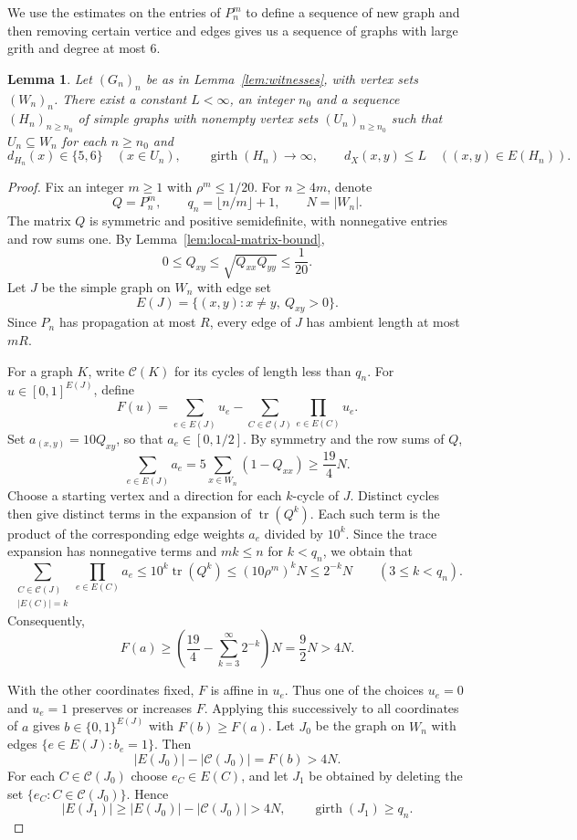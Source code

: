 \documentclass[11pt,a4paper]{article}
\newtheorem{lemma}[theorem]{Lemma}
\theoremstyle{definition}\newtheorem{definition}[theorem]{Definition}
\theoremstyle{remark}\newtheorem{remark}[theorem]{Remark}
\DeclareMathOperator{\girth}{girth}
\begin{document}
We use the estimates on the entries of $P_n^m$ to define a sequence of new graph and then removing certain vertice and edges gives us a sequence of graphs with large grith and degree at most $6$.
\begin{lemma}\label{lem:extraction}
Let $(G_n)_n$ be as in Lemma~\ref{lem:witnesses}, with vertex sets
$(W_n)_n$. There exist a constant $L<\infty$, an integer $n_0$ and a sequence
$(H_n)_{n\ge n_0}$ of simple graphs with nonempty vertex sets
$(U_n)_{n\ge n_0}$ such that $U_n\subseteq W_n$ for each $n\ge n_0$ and
$$
d_{H_n}(x)\in\{5,6\}\quad(x\in U_n),\qquad
\girth(H_n)\longrightarrow\infty,\qquad
d_X(x,y)\le L\quad((x,y)\in E(H_n)).
$$
\end{lemma}
\begin{proof}
Fix an integer $m\ge 1$ with $\rho^m\le 1/20$. For $n\ge 4m$, denote
$$
Q=P_n^m,\qquad q_n=\lfloor n/m\rfloor+1,\qquad N=|W_n|.
$$
The matrix $Q$ is symmetric and positive semidefinite, with
nonnegative entries and row sums one. By Lemma~\ref{lem:local-matrix-bound},
$$
0\le Q_{xy}\le \sqrt{Q_{xx}Q_{yy}}\le \frac1{20}.
$$
Let $J$ be the simple graph on $W_n$ with edge set
$$
E(J)=\{(x,y):x\ne y,\ Q_{xy}>0\}.
$$
Since $P_n$ has propagation at most $R$, every edge of $J$ has
ambient length at most $mR$.

For a graph $K$, write $\mathcal C(K)$ for its cycles of length
less than $q_n$. For $u\in[0,1]^{E(J)}$, define
$$
F(u)=\sum_{e\in E(J)}u_e
-\sum_{C\in\mathcal C(J)}\prod_{e\in E(C)}u_e.
$$
Set $a_{(x,y)}=10Q_{xy}$, so that $a_e\in[0,1/2]$. By symmetry
and the row sums of $Q$,
$$
\sum_{e\in E(J)}a_e
=5\sum_{x\in W_n}(1-Q_{xx})\ge \frac{19}{4}N.
$$
Choose a starting vertex and a direction for each $k$-cycle of $J$.
Distinct cycles then give distinct terms in the expansion of
$\operatorname{tr}(Q^k)$. Each such term is the product of the
corresponding edge weights $a_e$ divided by $10^k$. Since the trace
expansion has nonnegative terms and $mk\le n$ for $k<q_n$, we obtain that
$$
\sum_{\substack{C\in\mathcal C(J)\\ |E(C)|=k}}
  \prod_{e\in E(C)}a_e
\le 10^k\operatorname{tr}(Q^k)
\le (10\rho^m)^kN
\le 2^{-k}N
\qquad (3\le k<q_n).
$$
Consequently,
$$
F(a)\ge
\left(\frac{19}{4}-\sum_{k=3}^\infty 2^{-k}\right)N
=\frac92N>4N.
$$

With the other coordinates fixed, $F$ is affine in $u_e$. Thus
one of the choices $u_e=0$ and $u_e=1$ preserves or increases $F$.
Applying this successively to all coordinates of $a$ gives
$b\in\{0,1\}^{E(J)}$ with $F(b)\ge F(a)$. Let $J_0$ be the graph
on $W_n$ with edges $\{e\in E(J):b_e=1\}$. Then
$$
|E(J_0)|-|\mathcal C(J_0)|=F(b)>4N.
$$
For each $C\in\mathcal C(J_0)$ choose $e_C\in E(C)$, and let $J_1$
be obtained by deleting the set $\{e_C:C\in\mathcal C(J_0)\}$.
Hence
$$
|E(J_1)|\ge |E(J_0)|-|\mathcal C(J_0)|>4N,
\qquad \operatorname{girth}(J_1)\ge q_n.
$$


\end{proof}
\end{document}
